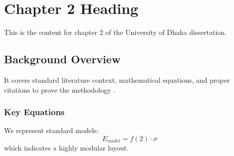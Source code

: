 \chapter{Chapter 2 Heading}
\label{ch:chapter2}
This is the content for chapter 2 of the University of Dhaka dissertation.

\section{Background Overview}
It covers standard literature context, mathematical equations, and proper citations to prove the methodology \cite{texbook}.

\subsection{Key Equations}
We represent standard models:
\begin{equation}
    E_{model} = f(2) \cdot \sigma
\end{equation}
which indicates a highly modular layout.
